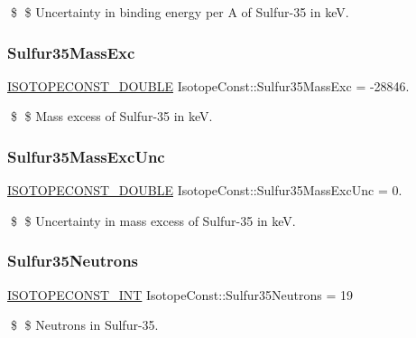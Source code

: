 \$ \$ Uncertainty in binding energy per A of Sulfur-\/35 in keV. \mbox{\label{group___isotope_const-_sulfur-_s35_ga8b146be26b7bf7eec301e58349a10caa}} 
\subsubsection{\texorpdfstring{Sulfur35\+Mass\+Exc}{Sulfur35MassExc}}
{\footnotesize\ttfamily \mbox{\hyperlink{group___isotope_const-_macros_ga8f45a7272ce02c0b4c65c44636ed719a}{I\+S\+O\+T\+O\+P\+E\+C\+O\+N\+S\+T\+\_\+\+D\+O\+U\+B\+LE}} Isotope\+Const\+::\+Sulfur35\+Mass\+Exc = -\/28846.}

\$ \$ Mass excess of Sulfur-\/35 in keV. \mbox{\label{group___isotope_const-_sulfur-_s35_ga89de3cc608e2633d7389c365ea7e1cf3}} 
\subsubsection{\texorpdfstring{Sulfur35\+Mass\+Exc\+Unc}{Sulfur35MassExcUnc}}
{\footnotesize\ttfamily \mbox{\hyperlink{group___isotope_const-_macros_ga8f45a7272ce02c0b4c65c44636ed719a}{I\+S\+O\+T\+O\+P\+E\+C\+O\+N\+S\+T\+\_\+\+D\+O\+U\+B\+LE}} Isotope\+Const\+::\+Sulfur35\+Mass\+Exc\+Unc = 0.}

\$ \$ Uncertainty in mass excess of Sulfur-\/35 in keV. \mbox{\label{group___isotope_const-_sulfur-_s35_ga2508463eaa90e21ffc45869a3d39a189}} 
\subsubsection{\texorpdfstring{Sulfur35\+Neutrons}{Sulfur35Neutrons}}
{\footnotesize\ttfamily \mbox{\hyperlink{group___isotope_const-_macros_ga5f18360b3e99483a35c32d789e62621c}{I\+S\+O\+T\+O\+P\+E\+C\+O\+N\+S\+T\+\_\+\+I\+NT}} Isotope\+Const\+::\+Sulfur35\+Neutrons = 19}

\$ \$ Neutrons in Sulfur-\/35. \mbox{\label{group___isotope_const-_sulfur-_s35_gaaeb23ce37e0c634ccdbe516cf5332894}} 
